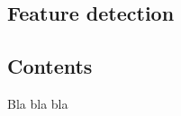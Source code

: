   \begin{titlepage}
    \vspace*{\fill}
      \part{Feature detection}
    \vspace*{\fill}
  \end{titlepage}

\chapter*{Contents}


Bla bla bla


